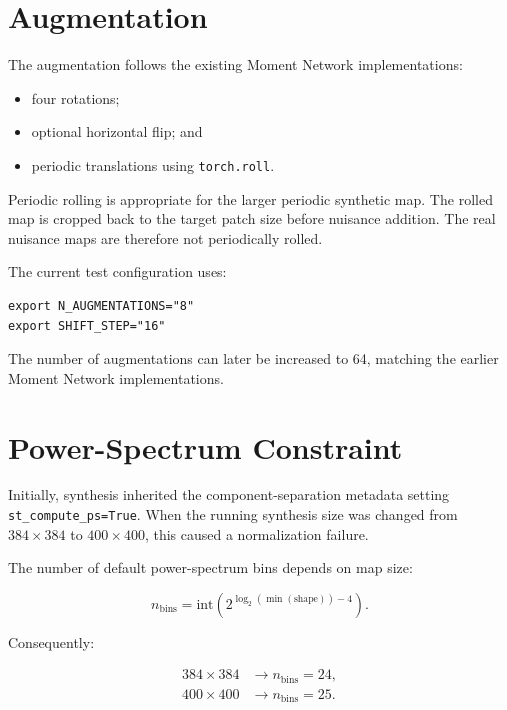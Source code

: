 \documentclass[11pt]{article}
\begin{document}
\section{Augmentation}

The augmentation follows the existing Moment Network implementations:

\begin{itemize}
  \item four rotations;
  \item optional horizontal flip; and
  \item periodic translations using \texttt{torch.roll}.
\end{itemize}

Periodic rolling is appropriate for the larger periodic synthetic map.  The
rolled map is cropped back to the target patch size before nuisance addition.
The real nuisance maps are therefore not periodically rolled.

The current test configuration uses:

\begin{lstlisting}
export N_AUGMENTATIONS="8"
export SHIFT_STEP="16"
\end{lstlisting}

The number of augmentations can later be increased to 64, matching the earlier
Moment Network implementations.

\section{Power-Spectrum Constraint}

Initially, synthesis inherited the component-separation metadata setting
\texttt{st\_compute\_ps=True}.  When the running synthesis size was changed
from $384 \times 384$ to $400 \times 400$, this caused a normalization failure.

The number of default power-spectrum bins depends on map size:

\begin{equation}
  n_{\mathrm{bins}} =
  \mathrm{int}\left(2^{\log_2(\min(\mathrm{shape})) - 4}\right).
\end{equation}

Consequently:

\begin{align}
  384 \times 384 &\longrightarrow n_{\mathrm{bins}} = 24, \\
  400 \times 400 &\longrightarrow n_{\mathrm{bins}} = 25.
\end{align}
\end{document}

